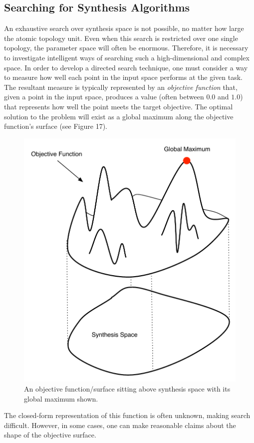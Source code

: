 \documentclass[12pt]{report} 	%
\numberwithin{figure}{chapter}
\numberwithin{table}{chapter}
\numberwithin{equation}{chapter}
\begin{document}
\begin{flushleft}
\subsection{Searching for Synthesis Algorithms}
An exhaustive search over synthesis space is not possible, no matter how large the atomic topology unit. Even when this search is restricted over one single topology, the parameter space will often be enormous. Therefore, it is necessary to investigate intelligent ways of searching such a high-dimensional and complex space. In order to develop a directed search technique, one must consider a way to measure how well each point in the input space performs at the given task. The resultant measure is typically represented by an \textit{objective function} that, given a point in the input space, produces a value (often between $0.0$ and $1.0$) that represents how well the point meets the target objective. The optimal solution to the problem will exist as a global maximum along the objective function's surface (see Figure 17). 
\begin{figure}[h!]
\vspace{24pt}
\begin{center}
\includegraphics[scale=0.7]{FitnessFunction}
\caption[Fitness function]{An objective function/surface sitting above synthesis space with its global maximum shown.}
\end{center}
\vspace{6pt}
\end{figure}
The closed-form representation of this function is often unknown, making search difficult. However, in some cases, one can make reasonable claims about the shape of the objective surface.


\end{flushleft}
\end{document}
